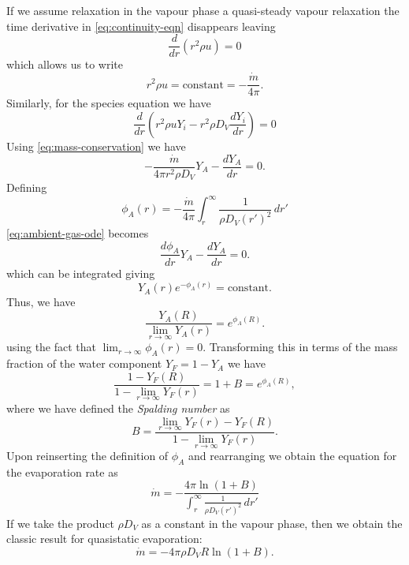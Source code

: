 \documentclass[11pt,twoside]{report}
\begin{document}
If we assume relaxation in the vapour phase a quasi-steady vapour relaxation the time derivative in \eqref{eq:continuity-eqn} disappears leaving
\begin{equation}
  \frac{d}{dr} ( r^2 \rho u ) = 0
\end{equation}
which allows us to write
\begin{equation}\label{eq:mass-conservation}
  r ^2 \rho u = \textrm{constant} = -\frac{\dot{m}}{4\pi}.
\end{equation}
Similarly, for the species equation we have
\begin{equation}
  \frac{d}{dr} \left(
  r^2 \rho u Y_i - r^2 \rho D_V \frac{d Y_i}{dr}
  \right) = 0
  \label{eq:quasistatic-vapour-species-conservation}
\end{equation}
Using \eqref{eq:mass-conservation} we have
\begin{equation}\label{eq:ambient-gas-ode}
  -\frac{\dot{m}}{4\pi r^2 \rho D_V} Y_A - \frac{d Y_A}{dr} = 0.
\end{equation}
Defining
\begin{equation*}
  \phi_A(r) = -\frac{\dot{m}}{4\pi}
  \int_r^\infty  \frac{1}{\rho D_V (r')^2} \, dr'
\end{equation*}
\eqref{eq:ambient-gas-ode} becomes
\begin{equation}
  \frac{d\phi_A}{dr} Y_A - \frac{d Y_A}{dr} = 0.
\end{equation}
which can be integrated%
giving
\begin{equation}
  Y_A(r) e^{-\phi_A(r)} = \textrm{constant}.
\end{equation}
Thus, we have
\begin{equation}
  \frac{Y_A(R)}{\displaystyle{\lim_{r \to \infty}} Y_A(r)} = e^{\phi_A(R)}.
\end{equation}
using the fact that $\displaystyle{\lim_{r \to \infty} \phi_A(r) = 0}$.
Transforming this in terms of the mass fraction of the water component $Y_F = 1 - Y_A$ we have
\begin{equation}
  \frac{1 - Y_F(R)}{1 - \displaystyle{\lim_{r \to \infty}} Y_F(r)} =
  1 + B = e^{\phi_A(R)},
\end{equation}
where we have defined the \emph{Spalding number} as
\begin{equation}
  B =
  \frac{\displaystyle{\lim_{r \to \infty}} Y_F(r) - Y_F(R)}
       {1 - \displaystyle{\lim_{r \to \infty}} Y_F(r)}.
\end{equation}
Upon reinserting the definition of $\phi_A$ and rearranging we obtain the equation for the evaporation rate as
\begin{equation}
  \dot{m} = -
  \frac{4\pi \ln{(1 + B)}}
       {\int_r^\infty  \frac{1}{\rho D_V (r')^2} \, dr'}
\end{equation}
If we take the product $\rho D_V$ as a constant in the vapour phase, then we obtain the classic result for quasistatic evaporation:
\begin{equation}
  \dot{m} = - 4\pi \rho D_V R \ln{(1 + B)}.
\end{equation}
\end{document}
